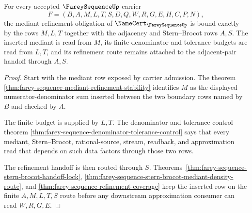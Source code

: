 \begin{theorem}
\label{thm:farey-sequence-refinement-obligation}
For every accepted $\FareySequenceUp$ carrier
$$
F=(B,A,M,L,T,S,D,Q,W,R,G,E,H,C,P,N),
$$
the mediant refinement obligation of $\NameCert_{\FareySequenceUp}$ is bound exactly by the rows $M,L,T$ together with the adjacency and Stern--Brocot rows $A,S$. The inserted mediant is read from $M$, its finite denominator and tolerance budgets are read from $L,T$, and its refinement route remains attached to the adjacent-pair handoff through $A,S$.
\end{theorem}
\begin{proof}
Start with the mediant row exposed by carrier admission. The theorem \autoref{thm:farey-sequence-mediant-refinement-stability} identifies $M$ as the displayed numerator-denominator sum inserted between the two boundary rows named by $B$ and checked by $A$.

The finite budget is supplied by $L,T$. The denominator and tolerance control theorem \autoref{thm:farey-sequence-denominator-tolerance-control} says that every mediant, Stern--Brocot, rational-source, stream, readback, and approximation read that depends on such data factors through those two rows.

The refinement handoff is then routed through $S$. Theorems~\ref{thm:farey-sequence-stern-brocot-handoff-lock}, \ref{thm:farey-sequence-stern-brocot-mediant-density-route}, and \ref{thm:farey-sequence-refinement-coverage} keep the inserted row on the finite $A,M,L,T,S$ route before any downstream approximation consumer can read $W,R,G,E$.
\end{proof}

